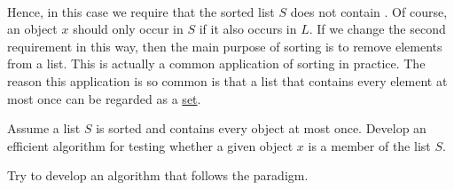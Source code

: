 \begin{enumerate}
\begin{enumerate}
        \\[0.2cm]
        Hence, in this case we require that the sorted list $S$ does not contain
        .
        Of course, an object $x$ should only occur in $S$ if it also occurs in $L$.  If we change
        the second requirement in this way, then the main purpose of sorting is to remove 
        elements from a list.  This is actually a common application of sorting in practice.  The
        reason this application is so common is that a list that contains every element at
        most once can be regarded as a \href{https://en.wikipedia.org/wiki/Set_(mathematics)}{set}.
  \end{enumerate}
\end{enumerate}

\exercise
Assume a list $S$ is sorted and contains every object at most once.  Develop an efficient
algorithm for testing whether a given object $x$ is a member of the list $S$.

\hint Try to develop an algorithm that follows the 
paradigm. 
\eoxs

